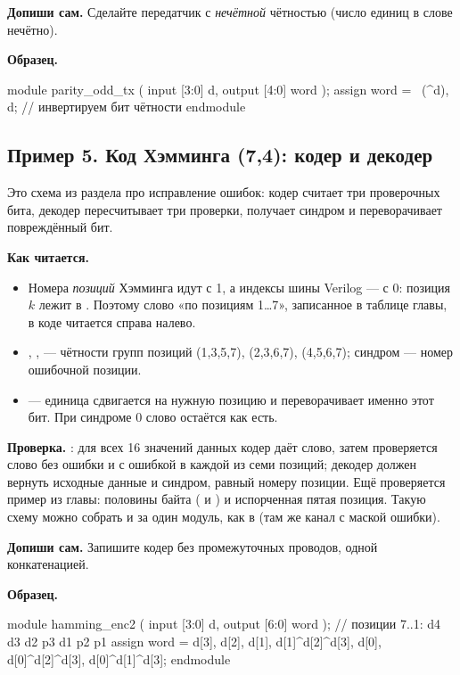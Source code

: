 \textbf{Допиши сам.} Сделайте передатчик с \emph{нечётной} чётностью (число
единиц в слове нечётно).

\textbf{Образец.}\par\nopagebreak
\begin{vcode}
module parity_odd_tx (
    input  [3:0] d,
    output [4:0] word
);
    assign word = {~(^d), d};     // инвертируем бит чётности
endmodule
\end{vcode}

\subsection{Пример 5. Код Хэмминга (7,4): кодер и декодер}

Это схема из раздела про исправление ошибок: кодер считает три проверочных бита,
декодер пересчитывает три проверки, получает синдром и переворачивает
повреждённый бит.


\textbf{Как читается.}
\begin{itemize}
  \item Номера \emph{позиций} Хэмминга идут с 1, а индексы шины Verilog --- с 0: позиция $k$ лежит в . Поэтому слово «по позициям 1\ldots 7», записанное в таблице главы, в коде читается справа налево.
  \item {}, ,  --- чётности групп позиций (1,3,5,7), (2,3,6,7), (4,5,6,7); синдром  --- номер ошибочной позиции.
  \item {} --- единица сдвигается на нужную позицию и переворачивает именно этот бит. При синдроме 0 слово остаётся как есть.
\end{itemize}
\textbf{Проверка.} : для всех 16 значений данных кодер даёт
слово, затем проверяется слово без ошибки и с ошибкой в каждой из семи позиций;
декодер должен вернуть исходные данные и синдром, равный номеру позиции. Ещё
проверяется пример из главы: половины байта  ( и
) и испорченная пятая позиция. Такую схему можно собрать и за один
модуль, как в  (там же канал с маской
ошибки).

\textbf{Допиши сам.} Запишите кодер без промежуточных проводов, одной
конкатенацией.

\textbf{Образец.}\par\nopagebreak
\begin{vcode}
module hamming_enc2 (
    input  [3:0] d,
    output [6:0] word
);
    // позиции 7..1:  d4  d3  d2  p3          d1  p2          p1
    assign word = {d[3], d[2], d[1], d[1]^d[2]^d[3], d[0], d[0]^d[2]^d[3], d[0]^d[1]^d[3]};
endmodule
\end{vcode}

